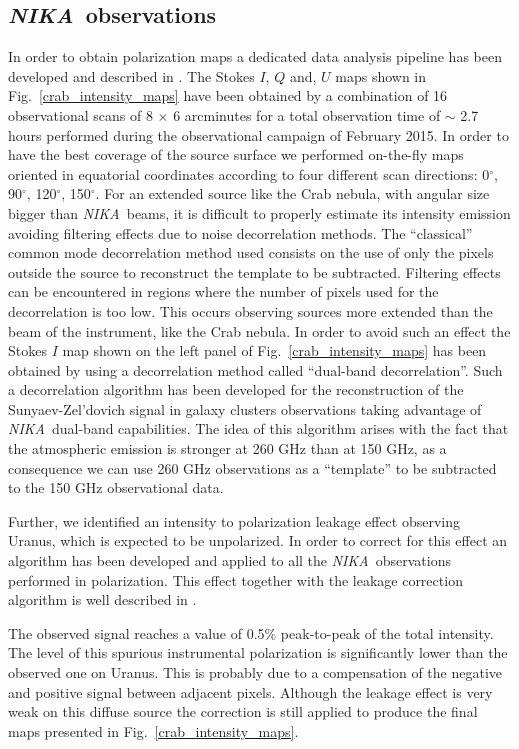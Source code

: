 \documentclass[twocolumn,traditabstract]{aa}
\def\NIKA{\textit{NIKA}}
\begin{document}
\subsection{\NIKA\ observations}\label{sec:nika_observations}
In order to obtain polarization maps a dedicated data analysis pipeline has been developed and described in \citet{ritacco2017}. 
The Stokes $I$, $Q$ and, $U$ maps shown in Fig.~\ref{crab_intensity_maps} have been obtained by a combination of 16 observational scans of 8 $\times$ 6 arcminutes for a total observation time of $\sim$ 2.7 hours performed during the observational campaign of February 2015. In order to have the best coverage of the source surface we performed on-the-fly maps oriented in equatorial coordinates according to four different scan directions: 0$^{\circ}$, 90$^{\circ}$, 120$^{\circ}$, 150$^{\circ}$. 
For an extended source like the Crab nebula, with angular size bigger than \NIKA\ beams, it is difficult to properly estimate its intensity emission avoiding filtering effects due to noise decorrelation methods. The ``classical'' common mode decorrelation method used consists on the use of only the pixels outside the source to reconstruct the template to be subtracted. Filtering effects can be encountered in regions where the number of pixels used for the decorrelation is too low.
This occurs observing sources more extended than the beam of the instrument, like the Crab nebula. 
In order to avoid such an effect the Stokes $I$ map shown on the left panel of Fig.~\ref{crab_intensity_maps} has been obtained by using a decorrelation method called ``dual-band decorrelation''. Such a decorrelation algorithm has been developed for the reconstruction of the Sunyaev-Zel'dovich signal in galaxy clusters observations \citep{adam2013} taking advantage of \NIKA\ dual-band capabilities. The idea of this algorithm arises with the fact that the atmospheric emission is stronger at 260 GHz than at 150 GHz, as a consequence we can use 260 GHz observations as a ``template'' to be subtracted to the 150 GHz observational data.
 
Further, we identified an intensity to polarization leakage effect observing Uranus, which is expected to be unpolarized. In order to correct for this effect an algorithm has been developed and applied to all the \NIKA\ observations performed in polarization. This effect together with the leakage correction algorithm is well described in \citet{ritacco2017}. 

The observed signal reaches a value of 0.5\% peak-to-peak of the total intensity. The level of this spurious instrumental polarization is significantly lower than the observed one on Uranus. This is probably due to a compensation of the negative and positive signal between adjacent pixels. Although the leakage effect is very weak on this diffuse source the correction is still applied to produce the final maps presented in Fig.~\ref{crab_intensity_maps}.
\end{document}

